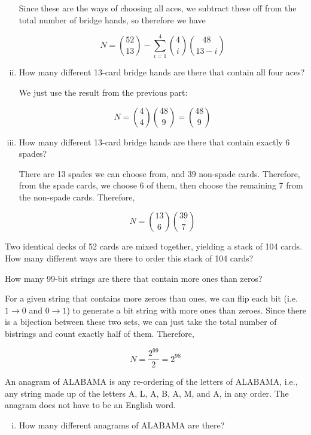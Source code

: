 \documentclass[11pt]{article}
\begin{document}
\begin{Parts}
\begin{enumerate}[i.]
\begin{solution}
      Since these are the ways of choosing all aces, we subtract these off from the total number of bridge hands, so therefore we have 

      \[ N = {52 \choose 13} - \sum_{i = 1}^4 {4 \choose i}{48 \choose 13-i}\]
    \end{solution}
    \item How many different 13-card bridge hands are there that contain all four aces? 
    
    \begin{solution}
      We just use the result from the previous part: 

      \[ N = {4 \choose 4}{48 \choose 9} = {48 \choose 9}\]
    \end{solution}
    \item How many different 13-card bridge hands are there that contain exactly 6 spades?
    
    \begin{solution}
      There are 13 spades we can choose from, and 39 non-spade cards. Therefore, from the spade cards, we choose 6 of them, then choose the remaining 7 from the non-spade cards. Therefore, 

      \[ N = {13 \choose 6}{39 \choose 7}\]
    \end{solution}
  \end{enumerate}

\Part Two identical decks of 52 cards are mixed together, yielding a
  stack of 104 cards.
  How many different ways are there to order this stack of 104 cards?
  
\Part How many 99-bit strings are there that contain more ones than
  zeros?

  \begin{solution}
    For a given string that contains more zeroes than ones, we can flip each bit (i.e. $1 \to 0$ and $0 \to 1$) to generate a bit string with more ones than zeroes. Since there is a bijection between these two sets, we can just take the total number of bistrings and count exactly half of them. Therefore, 

    \[ N = \frac{2^{99}}{2} = 2^{98}\]
  \end{solution}
  
\Part An anagram of ALABAMA is any re-ordering of the letters of ALABAMA, i.e., any
  string made up of the letters A, L, A, B, A, M, and A, in any order.
  The anagram does not have to be an English word.
  \begin{enumerate}[i.]
    \item How many different anagrams of ALABAMA are there? 
    

\end{enumerate}
\end{Parts}
\end{document}
